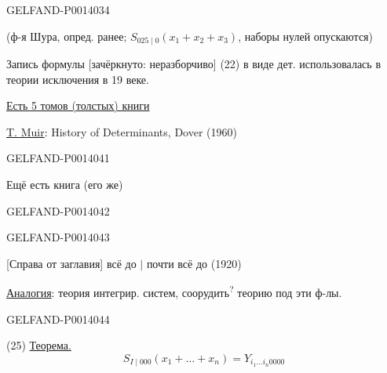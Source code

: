 \begin{GelfandAdjacentEvidence}{GELFAND-P001403}{4}


(ф-я Шура, опред. ранее; \(S_{025\mid 0}(x_1+x_2+x_3)\), наборы нулей опускаются)

Запись формулы [зачёркнуто:
неразборчиво]
(22) в виде дет. использовалась в теории исключения в 19 веке.

\end{GelfandAdjacentEvidence}



\uline{Есть 5 томов (толстых) книги}

\uline{T. Muir}: History of Determinants, Dover (1960)


\begin{GelfandAdjacentEvidence}{GELFAND-P001404}{1}

Ещё есть книга (его же)

\end{GelfandAdjacentEvidence}
\begin{GelfandAdjacentEvidence}{GELFAND-P001404}{2}


\end{GelfandAdjacentEvidence}
\begin{GelfandAdjacentEvidence}{GELFAND-P001404}{3}


[Справа от заглавия] всё до  \(\vert\)
почти всё до (1920)

\uline{Аналогия}: теория интегрир. систем,
соорудить\textsuperscript{?} теорию под эти ф-лы.

\end{GelfandAdjacentEvidence}
\begin{GelfandAdjacentEvidence}{GELFAND-P001404}{4}



(25) \uline{Теорема.}
\[
S_{I\mid000}(x_1+\dots+x_n)=Y_{i_1\dots i_n0000}
\]
\end{GelfandAdjacentEvidence}
